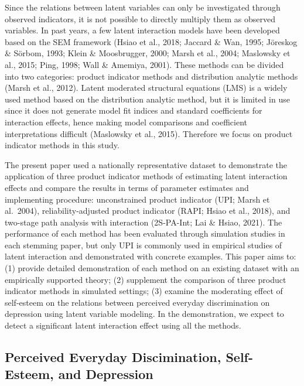 \documentclass[
  man]{apa7}
\begin{document}
Since the relations between latent variables can only be investigated through observed indicators, it is not possible to directly multiply them as observed variables. In past years, a few latent interaction models have been developed based on the SEM framework (Hsiao et al., 2018; Jaccard \& Wan, 1995; Jöreskog \& Sörbom, 1993; Klein \& Moosbrugger, 2000; Marsh et al., 2004; Maslowsky et al., 2015; Ping, 1998; Wall \& Amemiya, 2001). These methods can be divided into two categories: product indicator methods and distribution analytic methods (Marsh et al., 2012). Latent moderated structural equations (LMS) is a widely used method based on the distribution analytic method, but it is limited in use since it does not generate model fit indices and standard coefficients for interaction effects, hence making model comparisons and coefficient interpretations difficult (Maslowsky et al., 2015). Therefore we focus on product indicator methods in this study.

The present paper used a nationally representative dataset to demonstrate the application of three product indicator methods of estimating latent interaction effects and compare the results in terms of parameter estimates and implementing procedure: unconstrained product indicator (UPI; Marsh et al.~2004), reliability-adjusted product indicator (RAPI; Hsiao et al., 2018), and two-stage path analysis with interaction (2S-PA-Int; Lai \& Hsiao, 2021). The performance of each method has been evaluated through simulation studies in each stemming paper, but only UPI is commonly used in empirical studies of latent interaction and demonstrated with concrete examples. This paper aims to: (1) provide detailed demonstration of each method on an existing dataset with an empirically supported theory; (2) supplement the comparison of three product indicator methods in simulated settings; (3) examine the moderating effect of self-esteem on the relations between perceived everyday discrimination on depression using latent variable modeling. In the demonstration, we expect to detect a significant latent interaction effect using all the methods.

\hypertarget{perceived-everyday-discimination-self-esteem-and-depression}{%
\subsection{Perceived Everyday Discimination, Self-Esteem, and Depression}\label{perceived-everyday-discimination-self-esteem-and-depression}}
\end{document}
